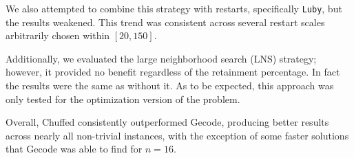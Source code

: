 We also attempted to combine this strategy with restarts, specifically \texttt{Luby}, but the results weakened. This trend was consistent across several restart scales arbitrarily chosen within $[20,150]$.

Additionally, we evaluated the large neighborhood search (LNS) strategy; however, it provided no benefit regardless of the retainment percentage. In fact the results were the same as without it. As to be expected, this approach was only tested for the optimization version of the problem.

Overall, Chuffed consistently outperformed Gecode, producing better results across nearly all non-trivial instances, with the exception of some faster solutions that Gecode was able to find for $n=16$. 

\begin{table}[h!]
\centering
{}
\caption{Optimization version: runtime in seconds and found objective value for different combinations of models, solvers and search strategies. Smaller instances ($6,8$) are left out because all configurations solved them instantly.}
\label{cp-opt-results}
\end{table}
